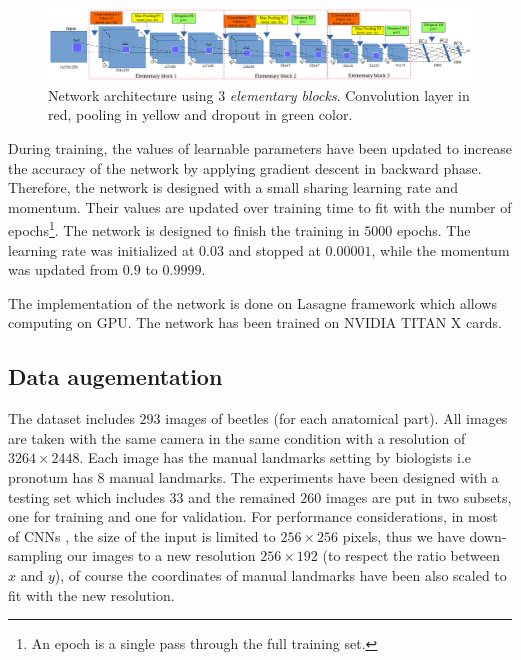 \documentclass[10pt]{article}
\begin{document}
\begin{figure}[!t]
\centering
\includegraphics[scale=0.32]{images/arch_model}
\caption{{\small{Network architecture using $3$ \textit{elementary blocks}.
  Convolution
  layer in red, pooling in yellow and dropout in green color.}}} 
\label{cnnnetwork2}
\end{figure}

During training, the values of learnable parameters have been updated
to increase the accuracy of the network by applying gradient descent
in backward phase. Therefore, the network is designed with a small
sharing learning rate and momentum. Their values are updated over
training time to fit with the number of epochs\footnote{An epoch is a
  single pass through the full training set.}. The network is designed
to finish the training in $5000$ epochs. The learning rate was
initialized at $0.03$ and stopped at $0.00001$, while the momentum was
updated from $0.9$ to $0.9999$.


The implementation of the network is done
on Lasagne framework \cite{lasagne} which allows computing on GPU. The
network has been trained on NVIDIA TITAN X cards.


\subsection{Data augementation}
\label{sec_data}
The dataset includes $293$ images of beetles (for each anatomical part). All
images are taken with the same camera in the same condition with a
resolution of $3264 \times 2448$. Each image has the manual
landmarks setting by biologists i.e pronotum has $8$ manual landmarks. The
experiments have been designed with a testing set which includes $33$
and the remained $260$ images are put in two subsets, one for
training and one for validation. For performance considerations, in most of CNNs
\cite{lecun2010convolutional, sun2013deep,  krizhevsky2012imagenet,
  cintas2016automatic}, the size of the input is limited to $256
\times 256$ pixels, thus we have down-sampling our images to a new
resolution $256 \times 192$ (to respect the ratio between $x$ and
$y$), of course the coordinates of manual landmarks have been also
scaled to fit with the new resolution.
\end{document}
